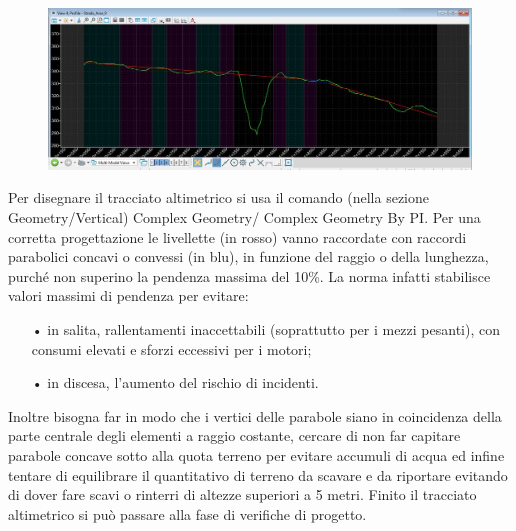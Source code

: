 \begin{figure}[H]
	\centering
	\includegraphics[width=\linewidth]{Figures/Profilo altimetrico}
    \label{fig:Profilo altimetrico}
\end{figure}

Per disegnare il tracciato altimetrico si usa il comando (nella sezione Geometry/Vertical) Complex Geometry/ Complex Geometry By PI. Per una corretta progettazione le livellette (in rosso) vanno raccordate con raccordi parabolici concavi o convessi (in blu), in funzione del raggio o della lunghezza, purché non superino la pendenza massima del 10\%. La norma infatti stabilisce valori massimi di pendenza per evitare:

\begin{itemize}
	\item[•] in salita, rallentamenti inaccettabili (soprattutto per i mezzi pesanti), con
	consumi elevati e sforzi eccessivi per i motori;
	\item[•] in discesa, l’aumento del rischio di incidenti.
\end{itemize}

Inoltre bisogna far in modo che i vertici delle parabole siano in coincidenza della parte centrale degli elementi a raggio costante, cercare di non far capitare parabole concave sotto alla quota terreno per evitare accumuli di acqua ed infine tentare di equilibrare il quantitativo di terreno da scavare e da riportare evitando di dover fare scavi o rinterri di altezze superiori a 5 metri. Finito il tracciato altimetrico si può passare alla fase di verifiche di progetto.